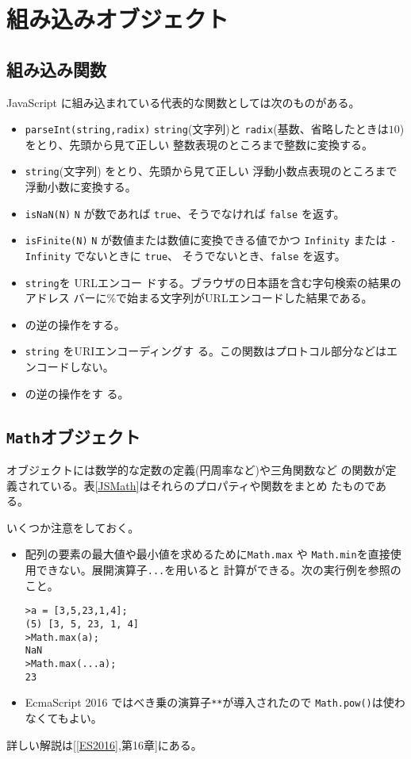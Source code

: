 \section{組み込みオブジェクト}
\subsection{組み込み関数}
JavaScript に組み込まれている代表的な関数としては次のものがある。
\begin{itemize}
 \item \Verb+parseInt(string,radix)+ \Verb+string+(文字列)と
       \Verb+radix+(基数、省略したときは$10$)をとり、先頭から見て正しい
       整数表現のところまで整数に変換する。
 \item {} \Verb+string+(文字列)
       をとり、先頭から見て正しい
       浮動小数点表現のところまで浮動小数に変換する。
 \item \Verb+isNaN(N)+ \Verb+N+ が数であれば \Verb+true+、そうでなければ
       \Verb+false+ を返す。
 \item \Verb+isFinite(N)+ \Verb+N+ が数値または数値に変換できる値でかつ
       \Verb+Infinity+ または \Verb+-Infinity+ でないときに \Verb+true+、
       そうでないとき、\Verb+false+ を返す。
 \item {} \texttt{string}を URLエンコー
			 ドする。ブラウザの日本語を含む字句検索の結果のアドレス
			 バーに\%で始まる文字列がURLエンコードした結果である。 
 \item {}
			 の逆の操作をする。
 \item {} \texttt{string} をURIエンコーディングす
			 る。この関数はプロトコル部分などはエンコードしない。
 \item {}  の逆の操作をす
			 る。
\end{itemize}
\subsection{\protect\texttt{Math}オブジェクト}
オブジェクトには数学的な定数の定義(円周率など)や三角関数など
の関数が定義されている。表\ref{JSMath}はそれらのプロパティや関数をまとめ
たものである。%

いくつか注意をしておく。
\begin{itemize}
 \item 配列の要素の最大値や最小値を求めるために\Verb+Math.max+ や
       \Verb+Math.min+を直接使用できない。展開演算子\Verb+...+を用いると
       計算ができる。次の実行例を参照のこと。
\begin{Verbatim}
>a = [3,5,23,1,4];
(5) [3, 5, 23, 1, 4]
>Math.max(a);
NaN
>Math.max(...a);
23
\end{Verbatim}
 \item EcmaScript 2016 ではべき乗の演算子\texttt{**}が導入されたので
\texttt{Math.pow()}は使わなくてもよい。
\end{itemize}
詳しい解説は[\ref{ES2016},第16章]にある。

